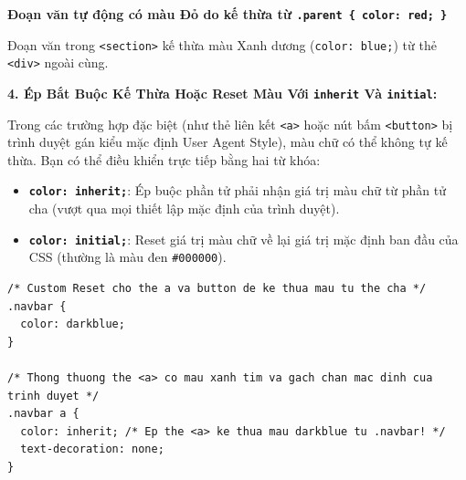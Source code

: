 \documentclass[11pt,oneside]{book}
\newcommand{\codeinline}[1]{\textcolor{accentOrange}{\texttt{#1}}}
\begin{document}
\begin{browserWindow}
\vspace{2pt}
\begin{tcolorbox}[
    enhanced,
    colback=white,
    colframe=gray!30,
    arc=6pt, boxrule=0.8pt,
    top=10pt, bottom=10pt, left=12pt, right=12pt
]
  {\sffamily\bfseries\color{red!80!black} Đoạn văn tự động có màu Đỏ do kế thừa từ \codeinline{.parent \{ color: red; \}}}\\[6pt]
  
  \begin{tcolorbox}[colback=blue!5, colframe=blue!40, arc=4pt, boxrule=0.6pt, top=6pt, bottom=6pt, left=8pt, right=8pt, fontupper=\sffamily\bfseries\color{blue!80!black}]
    Đoạn văn trong \codeinline{<section>} kế thừa màu Xanh dương (\codeinline{color: blue;}) từ thẻ \codeinline{<div>} ngoài cùng.
  \end{tcolorbox}
\end{tcolorbox}
\end{browserWindow}

\textbf{4. Ép Bắt Buộc Kế Thừa Hoặc Reset Màu Với \codeinline{inherit} Và \codeinline{initial}:}

\begin{conceptBox}
Trong các trường hợp đặc biệt (như thẻ liên kết \codeinline{<a>} hoặc nút bấm \codeinline{<button>} bị trình duyệt gán kiểu mặc định User Agent Style), màu chữ có thể không tự kế thừa. Bạn có thể điều khiển trực tiếp bằng hai từ khóa:
\begin{itemize}[leftmargin=1.5em, itemsep=3pt, parsep=0pt]
    \item \textbf{\codeinline{color: inherit;}}: Ép buộc phần tử phải nhận giá trị màu chữ từ phần tử cha (vượt qua mọi thiết lập mặc định của trình duyệt).
    \item \textbf{\codeinline{color: initial;}}: Reset giá trị màu chữ về lại giá trị mặc định ban đầu của CSS (thường là màu đen \codeinline{\#000000}).
\end{itemize}
\end{conceptBox}

\begin{codeWindow}
\begin{lstlisting}[language=CSS3]
/* Custom Reset cho the a va button de ke thua mau tu the cha */
.navbar {
  color: darkblue;
}

/* Thong thuong the <a> co mau xanh tim va gach chan mac dinh cua trinh duyet */
.navbar a {
  color: inherit; /* Ep the <a> ke thua mau darkblue tu .navbar! */
  text-decoration: none;
}
\end{lstlisting}
\end{codeWindow}
\end{document}
